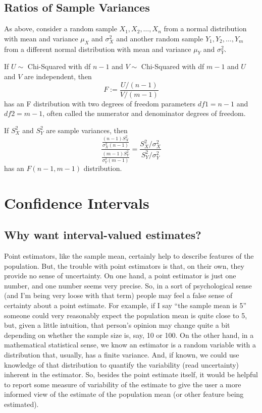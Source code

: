 \documentclass[
]{book}
\begin{document}
\hypertarget{ratios-of-sample-variances}{%
\section{Ratios of Sample Variances}\label{ratios-of-sample-variances}}

As above, consider a random sample \(X_1, X_2, \ldots, X_{n}\) from a normal distribution with mean and variance \(\mu_X\) and \(\sigma_X^2\) and another random sample \(Y_1, Y_2, \ldots, Y_m\) from a different normal distribution with mean and variance \(\mu_Y\) and \(\sigma_Y^2\).

If \(U\sim\) Chi-Squared with df \(n-1\) and \(V\sim\) Chi-Squared with df \(m-1\) and \(U\) and \(V\) are independent, then
\[F := \frac{U/(n-1)}{V/(m-1)}\]
has an F distribution with two degrees of freedom parameters \(df1 = n-1\) and \(df2 = m-1\), often called the numerator and denominator degrees of freedom.

If \(S_X^2\) and \(S_Y^2\) are sample variances, then
\[\frac{\frac{(n-1)S_X^2}{\sigma_X^2(n-1)}}{\frac{(m-1)S_Y^2}{\sigma_Y^2(m-1)}} = \frac{S_X^2/\sigma_X^2}{S_Y^2/\sigma_Y^2}\]
has an \(F(n-1, m-1)\) distribution.

\hypertarget{confidence-intervals}{%
\chapter{Confidence Intervals}\label{confidence-intervals}}

\hypertarget{why-want-interval-valued-estimates}{%
\section{Why want interval-valued estimates?}\label{why-want-interval-valued-estimates}}

Point estimators, like the sample mean, certainly help to describe features of the population. But, the trouble with point estimators is that, on their own, they provide no sense of uncertainty. On one hand, a point estimator is just one number, and one number seems very precise. So, in a sort of psychological sense (and I'm being very loose with that term) people may feel a false sense of certainty about a point estimate. For example, if I say ``the sample mean is 5'' someone could very reasonably expect the population mean is quite close to 5, but, given a little intuition, that person's opinion may change quite a bit depending on whether the sample size is, say, 10 or 100. On the other hand, in a mathematical statistical sense, we know an estimator is a random variable with a distribution that, usually, has a finite variance. And, if known, we could use knowledge of that distribution to quantify the variability (read uncertainty) inherent in the estimator. So, besides the point estimate itself, it would be helpful to report some measure of variability of the estimate to give the user a more informed view of the estimate of the population mean (or other feature being estimated).
\end{document}
